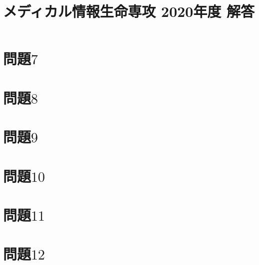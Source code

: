 \documentclass{jsarticle}
\title{メディカル情報生命専攻 2020年度 解答}
\author{}
\date{}
\begin{document}
\maketitle

\section*{問題$7$}
\section*{問題$8$}
\section*{問題$9$}
\section*{問題$10$}
\section*{問題$11$}
\section*{問題$12$}
\end{document}
